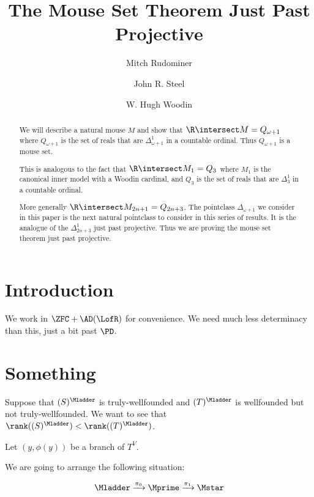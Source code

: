 \documentclass[oneside,12pt]{amsart}
\begin{document}
\title{The Mouse Set Theorem Just Past Projective}
\author{Mitch Rudominer}
\author{John R. Steel}
\author{W. Hugh Woodin}



\begin{abstract}
We will describe a natural mouse $M$ and show that $\R\intersect M = Q_{\omega+1}$
where $Q_{\omega+1}$  is the set of reals that are
$\Delta^1_{\omega+1}$ in a countable ordinal. Thus $Q_{\omega+1}$
is a mouse set.

This is analogous to the fact that $\R\intersect M_1 = Q_3$ where $M_1$ is the
canonical inner model with a Woodin cardinal, and $Q_3$ is the set of reals
that are $\Delta^1_3$ in a countable ordinal.

More generally $\R\intersect M_{2n+1} = Q_{2n+3}$.
The pointclass $\Delta_{\omega+1}$  we consider in this paper is the next natural
pointclass to consider in this series of results. It is the analogue of
the $\Delta^1_{2n+3}$ just past projective. Thus we are proving the mouse
set theorem just past projective.
\end{abstract}

\maketitle

\tableofcontents

\section{Introduction}
\label{section:intro}

We work in $\ZFC+\AD(\LofR)$ for convenience. We need much less determinacy
than this, just a bit past $\PD$.

\section{Something}
\label{secion:something}

Suppose that $(S)^{\Mladder}$ is truly-wellfounded and $(T)^{\Mladder}$ is
wellfounded but not truly-wellfounded. We want to see that
$\rank((S)^{\Mladder}) < \rank((T)^{\Mladder})$.

Let $(y,\phi(y))$ be a branch of $T^V$.


We are going to arrange the following situation:

\begin{equation}
\label{big-setup}
\Mladder \xrightarrow{\pi_0} \Mprime \xrightarrow{\pi_1} \Mstar
\end{equation}
\end{document}
